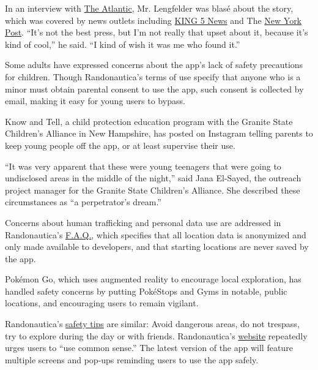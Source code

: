 In an interview with
\href{https://www.theatlantic.com/technology/archive/2020/07/randonautica-app-tiktok-body-reddit-quantum/614401/}{The
Atlantic}, Mr. Lengfelder was blasé about the story, which was covered
by news outlets including
\href{https://www.king5.com/article/news/local/remains-found-on-west-seattle-beach-identified/281-d3a505c4-1ea2-4e72-984a-f5bb4f8fa843}{KING
5 News} and The
\href{https://nypost.com/2020/07/08/reward-money-raised-after-seattle-tiktokers-find-bodies-in-suitcase/}{New
York Post}. ``It's not the best press, but I'm not really that upset
about it, because it's kind of cool,'' he said. ``I kind of wish it was
me who found it.''

Some adults have expressed concerns about the app's lack of safety
precautions for children. Though Randonautica's terms of use specify
that anyone who is a minor must obtain parental consent to use the app,
such consent is collected by email, making it easy for young users to
bypass.

Know and Tell, a child protection education program with the Granite
State Children's Alliance in New Hampshire, has posted on Instagram
telling parents to keep young people off the app, or at least supervise
their use.

``It was very apparent that these were young teenagers that were going
to undisclosed areas in the middle of the night,'' said Jana El-Sayed,
the outreach project manager for the Granite State Children's Alliance.
She described these circumstances as ``a perpetrator's dream.''

Concerns about human trafficking and personal data use are addressed in
Randonautica's
\href{https://www.randonautica.com/got-questions}{F.A.Q.}, which
specifies that all location data is anonymized and only made available
to developers, and that starting locations are never saved by the app.

Pokémon Go, which uses augmented reality to encourage local exploration,
has handled safety concerns by putting PokéStops and Gyms in notable,
public locations, and encouraging users to remain vigilant.

Randonautica's
\href{https://www.randonautica.com/be-a-responsible-randonaut}{safety
tips} are similar: Avoid dangerous areas, do not trespass, try to
explore during the day or with friends. Randonautica's
\href{https://www.randonautica.com/be-a-responsible-randonaut}{website}
repeatedly urges users to ``use common sense.'' The latest version of
the app will feature multiple screens and pop-ups reminding users to use
the app safely.

